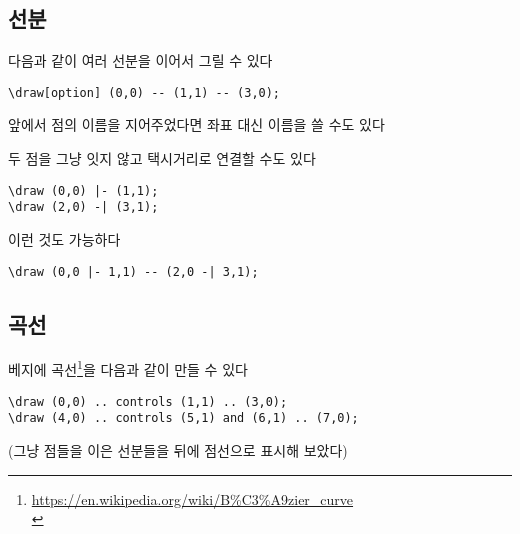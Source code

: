 \documentclass[12pt]{beamer}
\begin{document}
\subsection{선분}
\begin{frame}[fragile]{\secname}{\subsecname}
	다음과 같이 여러 선분을 이어서 그릴 수 있다
	\begin{lstlisting}
\draw[option] (0,0) -- (1,1) -- (3,0);
	\end{lstlisting}


	\vfill
	앞에서 점의 이름을 지어주었다면 좌표 대신 이름을 쓸 수도 있다
\end{frame}
\begin{frame}[fragile]{\secname}{\subsecname}
	두 점을 그냥 잇지 않고 택시거리로 연결할 수도 있다
	\begin{lstlisting}
\draw (0,0) |- (1,1);
\draw (2,0) -| (3,1);
	\end{lstlisting}
	

\vfill
	이런 것도 가능하다
	\begin{lstlisting}
\draw (0,0 |- 1,1) -- (2,0 -| 3,1);
	\end{lstlisting}
	
\end{frame}

\subsection{곡선}
\begin{frame}[fragile]{\secname}{\subsecname}
	베지에 곡선\footnote{\url{https://en.wikipedia.org/wiki/B\%C3\%A9zier_curve}\\}을 다음과 같이 만들 수 있다
	\begin{lstlisting}
\draw (0,0) .. controls (1,1) .. (3,0); 
\draw (4,0) .. controls (5,1) and (6,1) .. (7,0);
	\end{lstlisting}
	
	\vfill
	{\footnotesize (그냥 점들을 이은 선분들을 뒤에 점선으로 표시해 보았다)}
\end{frame}
\end{document}
